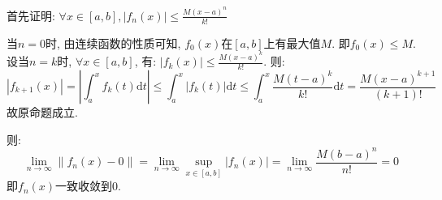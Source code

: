 \begin{solution}
    首先证明: \(\forall x \in [a,b], \left\vert f_{n}(x) \right\vert \le
    \frac{M(x-a)^{n}}{k!} \)

    当\(n=0\)时, 由连续函数的性质可知, \(f_{0}(x)\)在\([a,b]\)上有最大值\(M\).
    即\(f_{0}(x)\le M\).
    设当\(n=k\)时, \(\forall x \in [a,b]\), 有: \(\left\vert f_{k}(x)
        \right\vert \le
    \frac{M(x-a)^{k}}{k!}\). 则:
    \[
        \left\vert f_{k+1}(x) \right\vert
        = \left\vert \int_{a}^{x} f_{k}(t) \mathrm{d}t \right\vert
        \le \int_{a}^{x} \left\vert f_{k}(t) \right\vert \mathrm{d}t
        \le \int_{a}^{x} \frac{M(t-a)^{k}}{k!} \mathrm{d}t =
        \frac{M(x-a)^{k+1}}{(k+1)!}
    \]
    故原命题成立.

    则:
    \[
        \lim_{n \to \infty} \left\lVert f_{n}(x) - 0 \right\rVert
        =\lim_{n \to \infty} \sup_{x \in [a,b]} \left\vert f_{n}(x)
        \right\vert = \lim_{n \to \infty} \frac{M(b-a)^{n}}{n!} = 0
    \]
    即\(f_{n}(x)\)一致收敛到\(0\).
\end{solution}